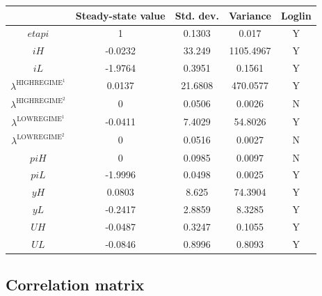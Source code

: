 \begin{tabular}{c|c|c|c|c|}
  & Steady-state value & Std. dev. & Variance & Loglin\\
\hline
${e\!t\!a\!p\!i}$ & 1 & 0.1303 & 0.017 & Y    \\
${i\!H}$ & -0.0232 & 33.249 & 1105.4967 & Y    \\
${i\!L}$ & -1.9764 & 0.3951 & 0.1561 & Y    \\
$\lambda^{\mathrm{HIGHREGIME}^{\mathrm{1}}}$ & 0.0137 & 21.6808 & 470.0577 & Y    \\
$\lambda^{\mathrm{HIGHREGIME}^{\mathrm{2}}}$ & 0 & 0.0506 & 0.0026 & N    \\
$\lambda^{\mathrm{LOWREGIME}^{\mathrm{1}}}$ & -0.0411 & 7.4029 & 54.8026 & Y    \\
$\lambda^{\mathrm{LOWREGIME}^{\mathrm{2}}}$ & 0 & 0.0516 & 0.0027 & N    \\
${p\!i\!H}$ & 0 & 0.0985 & 0.0097 & N    \\
${p\!i\!L}$ & -1.9996 & 0.0498 & 0.0025 & Y    \\
${y\!H}$ & 0.0803 & 8.625 & 74.3904 & Y    \\
${y\!L}$ & -0.2417 & 2.8859 & 8.3285 & Y    \\
${U\!H}$ & -0.0487 & 0.3247 & 0.1055 & Y    \\
${U\!L}$ & -0.0846 & 0.8996 & 0.8093 & Y    \\
\hline
\end{tabular}


\subsection{Correlation matrix}


